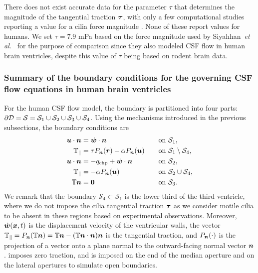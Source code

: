 \documentclass{template}
\begin{document}
There does not exist accurate data for the parameter $\tau$ that
determines the magnitude of the tangential traction $\bm{\tau}$, with only a few computational
studies reporting a value for a cilia force magnitude
\citep{Herlyng2025AdvectionDiffusion, Siyahhan2014FlowVentricles,
Thouvenin2020OriginCanal}. None of these report values for humans.
We set $\tau=7.9$ mPa based on the force magnitude used by
Siyahhan~\emph{et al.}~\citep{Siyahhan2014FlowVentricles}
for the purpose of comparison
since they also modeled CSF flow in human brain ventricles,
despite this value of $\tau$ being based on rodent brain data.

\subsubsection{Summary of the boundary conditions
for the governing CSF flow equations in human brain ventricles}
\label{sec:boundary_conditions_human}

For the human CSF flow model, the boundary is partitioned into
four parts: $\partial\mathcal{D} = \mathcal{S} = \mathcal{S}_1\cup\mathcal{S}_2\cup\mathcal{S}_3\cup\mathcal{S}_4$.
Using the mechanisms introduced in the previous subsections,
the boundary conditions are
\begin{alignat}{2}
    \uu\cdot\nn &= \dot{\ww}\cdot\nn &&\quad\mathrm{on \ \mathcal{S}_1}, \\
    \TT_{\parallel} &= \tau P_{\nn}(\rr) - \alpha P_{\nn}(\uu)
    &&\quad\mathrm{on \ \mathcal{S}_1\setminus\mathcal{S}_4}, \label{eq:cilia_bc} \\
    \uu\cdot\nn &= -q_{\mathrm{chp}} + \dot{\ww}\cdot\nn &&\quad\mathrm{on \ \mathcal{S}_2}, \\
    \TT_{\parallel} &= - \alpha P_{\nn}(\uu) &&\quad\mathrm{on \ \mathcal{S}_2\cup\mathcal{S}_4}, \label{eq:navier_bc} \\
    \TT\nn &= \bm{0} &&\quad\mathrm{on \ \mathcal{S}_3}. \label{eq:outlet_bc}
\end{alignat}
We remark that the boundary $\mathcal{S}_4\subset\mathcal{S}_1$ is the lower third of
the third ventricle, where we do not impose the cilia tangential traction $\bm{\tau}$
as we consider motile cilia to be absent in these regions based on experimental
observations. Moreover, $\dot{\bm{w}}(\bm{x}, t)$ is the displacement velocity of the ventricular walls,
the vector $\mathbb{T}_{\parallel}=P_{\bm{n}}(\mathbb{T}\bm{n})=\mathbb{T}\bm{n} - (\mathbb{T}\bm{n}\cdot\bm{n})\bm{n}$
is the tangential traction, and $P_{\bm{n}}(\cdot)$ is the projection
of a vector onto a plane normal
to the outward-facing normal vector $\bm{n}$. 
 imposes zero traction,
and is imposed on the end of the median aperture and on the lateral apertures
to simulate open boundaries.
\end{document}
